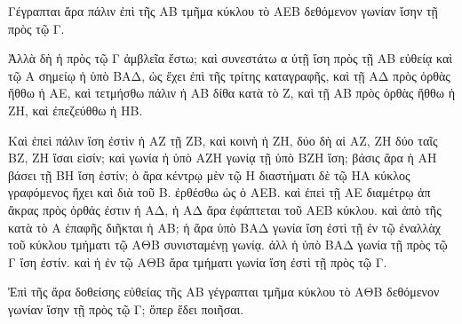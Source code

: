 \begin{Parallel}{}{}
{{\greekfont Γέγραπται ἄρα πάλιν ἐπὶ τῆς ΑΒ τμῆμα κύκλου τὸ ΑΕΒ δεθόμενον
γωνίαν ἴσην τῇ πρὸς τῷ Γ.}

{\greekfont Ἀλλὰ δὴ ἡ πρὸς τῷ Γ ἀμβλεῖα ἔστω; καὶ συνεστάτω α ὐτῇ
ἴση πρὸς τῇ ΑΒ εὐθείᾳ καὶ τῷ Α σημείῳ ἡ ὑπὸ ΒΑΔ, ὡς
ἔχει ἐπὶ τῆς τρίτης καταγραφῆς, καὶ τῇ ΑΔ πρὸς ὀρθὰς ἤθθω ἡ ΑΕ,
καὶ τετμήσθω πάλιν ἡ ΑΒ δίθα κατὰ τὸ Ζ, καὶ τῇ ΑΒ πρὸς ὀρθὰς
ἤθθω ἡ ΖΗ, καὶ ἐπεζεύθθω ἡ ΗΒ.}

{\greekfont Καὶ ἐπεὶ πάλιν ἴση ἐστὶν ἡ ΑΖ τῇ ΖΒ, καὶ κοινὴ ἡ ΖΗ, δύο δὴ αἱ
ΑΖ, ΖΗ δύο ταῖς ΒΖ, ΖΗ ἴσαι εἰσίν; καὶ γωνία ἡ ὑπὸ
ΑΖΗ γωνίᾳ τῇ ὑπὸ ΒΖΗ ἴση; βάσις ἄρα ἡ ΑΗ βάσει τῇ ΒΗ
ἴση ἐστίν; ὁ ἄρα κέντρῳ μὲν τῷ Η διαστήματι δὲ τῷ ΗΑ κύκλος
γραφόμενος ἥχει καὶ διὰ τοῦ Β. ἐρθέσθω ὡς ὁ ΑΕΒ. καὶ ἐπεὶ
τῇ ΑΕ διαμέτρῳ ἀπ ἄκρας πρὸς ὀρθάς ἐστιν ἡ ΑΔ, ἡ ΑΔ ἄρα
ἐφάπτεται τοῦ ΑΕΒ κύκλου. καὶ ἀπὸ τῆς κατὰ τὸ Α ἐπαφῆς διῆκται
ἡ ΑΒ; ἡ ἄρα ὑπὸ ΒΑΔ γωνία ἴση ἐστὶ τῇ ἐν τῷ ἐναλλὰχ τοῦ
κύκλου τμήματι  τῷ ΑΘΒ συνισταμένῃ γωνίᾳ. ἀλλ ἡ ὑπὸ ΒΑΔ γωνία τῇ πρὸς τῷ Γ ἴση ἐστίν. καὶ ἡ ἐν τῷ ΑΘΒ ἄρα τμήματι
γωνία ἴση  ἐστὶ τῇ πρὸς τῷ Γ.}

{\greekfont Ἐπὶ τῆς ἄρα δοθείσης εὐθείας τῆς ΑΒ γέγραπται τμῆμα κύκλου τὸ
ΑΘΒ δεθόμενον γωνίαν ἴσην τῇ πρὸς τῷ Γ; ὅπερ ἔδει ποιῆσαι.}}

\end{Parallel}
